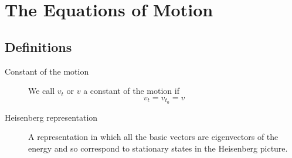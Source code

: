 \section{The Equations of Motion}

\subsection{Definitions}
\begin{definition}
\begin{description}
	\item[Constant of the motion]
	We call $v_t$ or $v$ a constant of the motion if
	\begin{equation}
	v_t = v_{t_0} = v
	\end{equation}
\end{description}
\end{definition}

\begin{definition}
\begin{description}
	\item[Heisenberg representation]
	A representation in which all the basic vectors are eigenvectors of the energy and so correspond to stationary states in the Heisenberg picture.
\end{description}
\end{definition}


